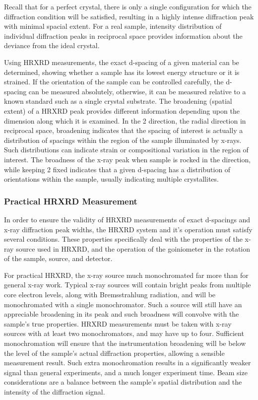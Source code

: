 Recall that for a perfect crystal, there is only a single configuration for which the diffraction condition will be satisfied, resulting in a highly intense diffraction peak with minimal spacial extent. For a real sample, intensity distribution of individual diffraction peaks in reciprocal space provides information about the deviance from the ideal crystal.

Using HRXRD measurements, the exact d-spacing of a given material can be determined, showing whether a sample has its lowest energy structure or it is strained. If the orientation of the sample can be controlled carefully, the d-spacing can be measured absolutely, otherwise, it can be measured relative to a known standard such as a single crystal substrate. The broadening (spatial extent) of a HRXRD peak provides different information depending upon the dimension along which it is examined. In the 2\straighttheta{} direction, the radial direction in reciprocal space, broadening indicates that the spacing of interest is actually a distribution of spacings within the region of the sample illuminated by x-rays. Such distributions can indicate strain or compositional variation in the region of interest. The broadness of the x-ray peak when sample is rocked in the \textomega{} direction, while keeping 2\straighttheta{} fixed indicates that a given d-spacing has a distribution of orientations within the sample, usually indicating multiple crystallites.

\subsubsection{Practical HRXRD Measurement}
In order to ensure the validity of HRXRD measurements of exact d-spacings and x-ray diffraction peak widths, the HRXRD system and it's operation must satisfy several conditions. These properties specifically deal with the properties of the x-ray source used in HRXRD, and the operation of the goiniometer in the rotation of the sample, source, and detector.

For practical HRXRD, the x-ray source much monochromated far more than for general x-ray work. Typical x-ray sources will contain bright peaks from multiple core electron levels, along with Bremsstrahlung radiation, and will be monochromated with a single monochromator. Such a source will still have an appreciable broadening in its peak and such broadness will convolve with the sample's true properties. HRXRD measurements must be taken with x-ray sources with at least two monochromators, and may have up to four. Sufficient monochromation will ensure that the instrumentation broadening will be below the level of the sample's actual diffraction properties, allowing a sensible measurement result. Such extra monochromation results in a significantly weaker signal than general experiments, and a much longer experiment time. Beam size considerations are a balance between the sample's spatial distribution and the intensity of the diffraction signal.


